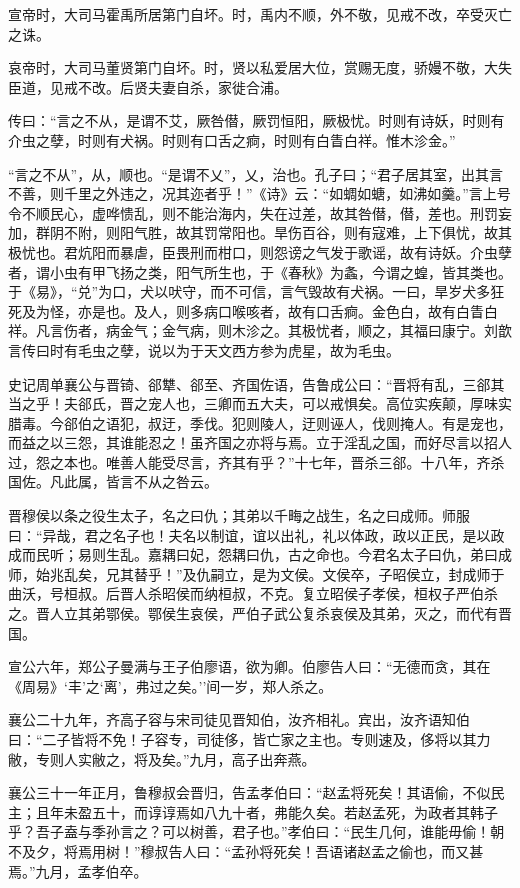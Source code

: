 \documentclass[]{article}
\begin{document}
宣帝时，大司马霍禹所居第门自坏。时，禹内不顺，外不敬，见戒不改，卒受灭亡之诛。

哀帝时，大司马董贤第门自坏。时，贤以私爱居大位，赏赐无度，骄嫚不敬，大失臣道，见戒不改。后贤夫妻自杀，家徙合浦。

传曰：``言之不从，是谓不艾，厥咎僣，厥罚恒阳，厥极忧。时则有诗妖，时则有介虫之孽，时则有犬祸。时则有口舌之痾，时则有白眚白祥。惟木沴金。''

``言之不从''，从，顺也。``是谓不乂''，乂，治也。孔子曰；``君子居其室，出其言不善，则千里之外违之，况其迩者乎！''《诗》云：``如蜩如螗，如沸如羹。''言上号令不顺民心，虚哗愦乱，则不能治海内，失在过差，故其咎僣，僣，差也。刑罚妄加，群阴不附，则阳气胜，故其罚常阳也。旱伤百谷，则有寇难，上下俱忧，故其极忧也。君炕阳而暴虐，臣畏刑而柑口，则怨谤之气发于歌谣，故有诗妖。介虫孽者，谓小虫有甲飞扬之类，阳气所生也，于《春秋》为螽，今谓之蝗，皆其类也。于《易》，``兑''为口，犬以吠守，而不可信，言气毁故有犬祸。一曰，旱岁犬多狂死及为怪，亦是也。及人，则多病口喉咳者，故有口舌痾。金色白，故有白眚白祥。凡言伤者，病金气；金气病，则木沴之。其极忧者，顺之，其福曰康宁。刘歆言传曰时有毛虫之孽，说以为于天文西方参为虎星，故为毛虫。

史记周单襄公与晋锜、郤犨、郤至、齐国佐语，告鲁成公曰：``晋将有乱，三郤其当之乎！夫郤氏，晋之宠人也，三卿而五大夫，可以戒惧矣。高位实疾颠，厚味实腊毒。今郤伯之语犯，叔迂，季伐。犯则陵人，迂则诬人，伐则掩人。有是宠也，而益之以三怨，其谁能忍之！虽齐国之亦将与焉。立于淫乱之国，而好尽言以招人过，怨之本也。唯善人能受尽言，齐其有乎？''十七年，晋杀三郤。十八年，齐杀国佐。凡此属，皆言不从之咎云。

晋穆侯以条之役生太子，名之曰仇；其弟以千畮之战生，名之曰成师。师服曰：``异哉，君之名子也！夫名以制谊，谊以出礼，礼以体政，政以正民，是以政成而民听；易则生乱。嘉耦曰妃，怨耦曰仇，古之命也。今君名太子曰仇，弟曰成师，始兆乱矣，兄其替乎！''及仇嗣立，是为文侯。文侯卒，子昭侯立，封成师于曲沃，号桓叔。后晋人杀昭侯而纳桓叔，不克。复立昭侯子孝侯，桓权子严伯杀之。晋人立其弟鄂侯。鄂侯生哀侯，严伯子武公复杀哀侯及其弟，灭之，而代有晋国。

宣公六年，郑公子曼满与王子伯廖语，欲为卿。伯廖告人曰：``无德而贪，其在《周易》`丰'之`离'，弗过之矣。''间一岁，郑人杀之。

襄公二十九年，齐高子容与宋司徒见晋知伯，汝齐相礼。宾出，汝齐语知伯曰：``二子皆将不免！子容专，司徒侈，皆亡家之主也。专则速及，侈将以其力敝，专则人实敝之，将及矣。''九月，高子出奔燕。

襄公三十一年正月，鲁穆叔会晋归，告孟孝伯曰：``赵孟将死矣！其语偷，不似民主；且年未盈五十，而谆谆焉如八九十者，弗能久矣。若赵孟死，为政者其韩子乎？吾子盍与季孙言之？可以树善，君子也。''孝伯曰：``民生几何，谁能毋偷！朝不及夕，将焉用树！''穆叔告人曰：``孟孙将死矣！吾语诸赵孟之偷也，而又甚焉。''九月，孟孝伯卒。
\end{document}
